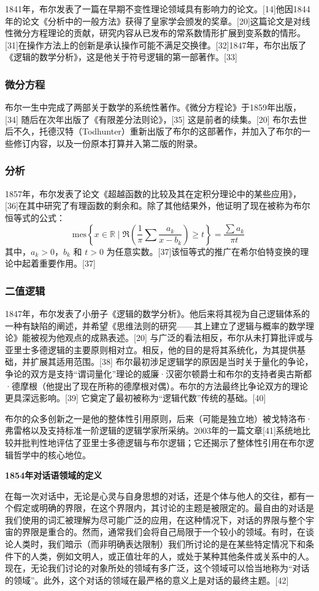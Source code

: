 1841年，布尔发表了一篇在早期不变性理论领域具有影响力的论文。[14]他因1844年的论文《分析中的一般方法》获得了皇家学会颁发的奖章。[20]这篇论文是对线性微分方程理论的贡献，研究内容从已发布的常系数情形扩展到变系数的情形。[31]在操作方法上的创新是承认操作可能不满足交换律。[32]1847年，布尔出版了《逻辑的数学分析》，这是他关于符号逻辑的第一部著作。[33]
\subsubsection{微分方程}  
布尔一生中完成了两部关于数学的系统性著作。《微分方程论》于1859年出版，[34] 随后在次年出版了《有限差分法则论》，[35] 这是前者的续集。[20] 布尔去世后不久，托德汉特（Todhunter）重新出版了布尔的这部著作，并加入了布尔的一些修订内容，以及一份原本打算并入第二版的附录。
\subsubsection{分析}  
1857年，布尔发表了论文《超越函数的比较及其在定积分理论中的某些应用》，[36]在其中研究了有理函数的剩余和。除了其他结果外，他证明了现在被称为布尔恒等式的公式：
\[
\mathrm{mes} \left\{ x \in \mathbb{R} \mid \Re \left( \frac{1}{\pi} \sum \frac{a_k}{x - b_k} \right) \geq t \right\} = \frac{\sum a_k}{\pi t}~
\]
其中，\( a_k > 0 \)，\( b_k \) 和 \( t > 0 \) 为任意实数。[37]该恒等式的推广在希尔伯特变换的理论中起着重要作用。[37]
\subsubsection{二值逻辑}  
1847年，布尔发表了小册子《逻辑的数学分析》。他后来将其视为自己逻辑体系的一种有缺陷的阐述，并希望《思维法则的研究——其上建立了逻辑与概率的数学理论》能被视为他观点的成熟表述。[20] 与广泛的看法相反，布尔从未打算批评或与亚里士多德逻辑的主要原则相对立。相反，他的目的是将其系统化，为其提供基础，并扩展其适用范围。[38] 布尔最初涉足逻辑学的原因是当时关于量化的争论，争论的双方是支持“谓词量化”理论的威廉·汉密尔顿爵士和布尔的支持者奥古斯都·德摩根（他提出了现在所称的德摩根对偶）。布尔的方法最终比争论双方的理论更具深远影响。[39] 它奠定了最初被称为“逻辑代数”传统的基础。[40]

布尔的众多创新之一是他的整体性引用原则，后来（可能是独立地）被戈特洛布·弗雷格以及支持标准一阶逻辑的逻辑学家所采纳。2003年的一篇文章[41]系统地比较并批判性地评估了亚里士多德逻辑与布尔逻辑；它还揭示了整体性引用在布尔逻辑哲学中的核心地位。

\textbf{1854年对话语领域的定义}  

在每一次对话中，无论是心灵与自身思想的对话，还是个体与他人的交往，都有一个假定或明确的界限，在这个界限内，其讨论的主题是被限定的。最自由的对话是我们使用的词汇被理解为尽可能广泛的应用，在这种情况下，对话的界限与整个宇宙的界限是重合的。然而，通常我们会将自己局限于一个较小的领域。有时，在谈论人类时，我们暗示（而非明确表达限制）我们所讨论的是在某些特定情况下和条件下的人类，例如文明人，或正值壮年的人，或处于某种其他条件或关系中的人。现在，无论我们讨论的对象所处的领域有多广泛，这个领域可以恰当地称为“对话的领域”。此外，这个对话的领域在最严格的意义上是对话的最终主题。[42]


